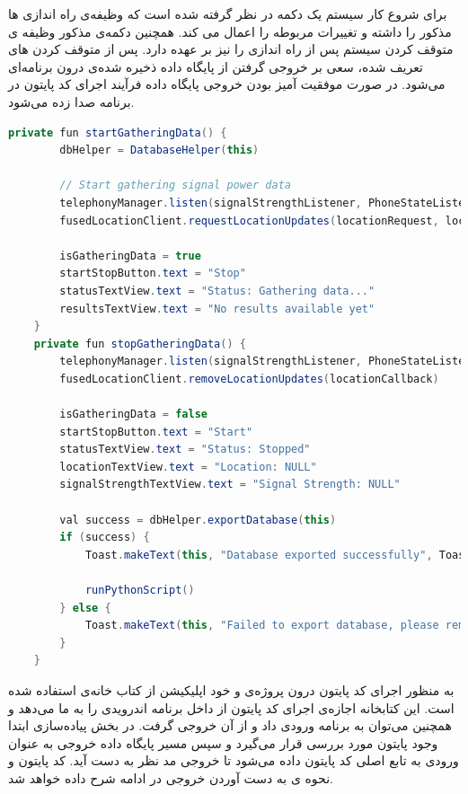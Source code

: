 برای شروع کار سیستم یک دکمه در نظر گرفته شده است که وظیفه‌ی راه اندازی ها مذکور را داشته و تغییرات  مربوطه را اعمال می کند. همچنین دکمه‌ی مذکور وظیفه ی متوقف کردن سیستم پس از راه اندازی را نیز بر عهده دارد. پس از متوقف کردن های تعریف شده، سعی بر خروجی گرفتن از پایگاه داده ذخیره شده‌ی درون برنامه‌ای می‌شود. در صورت موفقیت آمیز بودن خروجی پایگاه داده فرآیند اجرای کد پایتون در برنامه صدا زده می‌شود.

\begin{lstlisting}[language=Java]
	private fun startGatheringData() {
		dbHelper = DatabaseHelper(this)
		
		// Start gathering signal power data
		telephonyManager.listen(signalStrengthListener, PhoneStateListener.LISTEN_SIGNAL_STRENGTHS)
		fusedLocationClient.requestLocationUpdates(locationRequest, locationCallback, null)
		
		isGatheringData = true
		startStopButton.text = "Stop"
		statusTextView.text = "Status: Gathering data..."
		resultsTextView.text = "No results available yet"
	}
	private fun stopGatheringData() {
		telephonyManager.listen(signalStrengthListener, PhoneStateListener.LISTEN_NONE)
		fusedLocationClient.removeLocationUpdates(locationCallback)
		
		isGatheringData = false
		startStopButton.text = "Start"
		statusTextView.text = "Status: Stopped"
		locationTextView.text = "Location: NULL"
		signalStrengthTextView.text = "Signal Strength: NULL"
		
		val success = dbHelper.exportDatabase(this)
		if (success) {
			Toast.makeText(this, "Database exported successfully", Toast.LENGTH_SHORT).show()
			
			runPythonScript()
		} else {
			Toast.makeText(this, "Failed to export database, please remove it manually from Download folder", Toast.LENGTH_SHORT).show()
		}
	}
\end{lstlisting}

به منظور اجرای کد پایتون درون پروژه‌ی  و خود اپلیکیشن از کتاب خانه‌ی  استفاده شده است. این کتابخانه اجازه‌ی اجرای کد پایتون از داخل برنامه اندرویدی را به ما می‌دهد و همچنین می‌توان به برنامه ورودی داد و از آن خروجی گرفت. در بخش پیاده‌سازی ابتدا وجود پایتون مورد بررسی قرار می‌گیرد و سپس مسیر پایگاه داده خروجی به عنوان ورودی به تابع اصلی کد پایتون داده می‌شود تا خروجی مد نظر به دست آید. کد پایتون و نحوه ی به دست آوردن خروجی در ادامه شرح داده خواهد شد.

